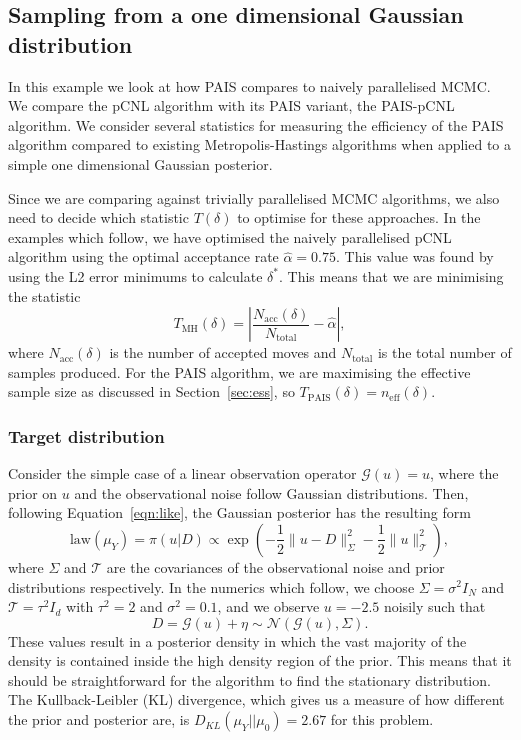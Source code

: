 \documentclass[final]{siamltex}
\newcommand{\G}{\mathcal{G}}
\newcommand{\neff}{n_{\text{eff}}}
\begin{document}
\subsection{Sampling from a one dimensional Gaussian distribution}\label{sec:problem 1}

In this example we look at how PAIS compares to naively parallelised
MCMC. We compare the pCNL algorithm \cite{cotter2013mcmc} with its
PAIS variant, the PAIS-pCNL algorithm. We consider several statistics
for measuring the efficiency of the PAIS algorithm compared to
existing Metropolis-Hastings algorithms when applied to a simple one
dimensional Gaussian posterior.


Since we are comparing against trivially parallelised MCMC algorithms,
we also need to decide which statistic $T(\delta)$ to optimise for
these approaches. In the examples which follow, we have optimised the naively parallelised pCNL algorithm using the optimal acceptance rate $\hat{\alpha} = 0.75$. This value was found by using the L2 error minimums to calculate $\delta^*$. This means that we are minimising the statistic
\[
	T_{\text{MH}}(\delta) = \left| \frac{N_{\text{acc}}(\delta)}{N_{\text{total}}} - \hat{\alpha} \right|,
\]
where $N_{\text{acc}}(\delta)$ is the number of accepted moves and
$N_{\text{total}}$ is the total number of samples produced. For the
PAIS algorithm, we are maximising the effective sample size as
discussed in Section~\ref{sec:ess}, so $T_{\text{PAIS}}(\delta) =
\neff(\delta)$.

\subsubsection{Target distribution}

Consider the simple case of a linear observation operator $\G(u) = u$, where the prior on $u$ and the observational noise follow Gaussian distributions. Then, following Equation~\ref{eqn:like}, the Gaussian posterior has the resulting form
\begin{equation}\label{eqn:Gaussian posterior}
	\text{law}(\mu_Y) = \pi(u|D) \propto \exp\left(-\frac{1}{2}\big\|u - D\big\|^2_\Sigma - \frac{1}{2}\big\|u\big\|^2_{\mathcal{T}}\right),
\end{equation}
where $\Sigma$ and $\mathcal{T}$ are the covariances of the
observational noise and prior distributions respectively. In the
numerics which follow, we choose $\Sigma = \sigma^2I_N$ and
$\mathcal{T} = \tau^2I_d$ with $\tau^2 =2$ and $\sigma^2 = 0.1$, and
we observe $u=-2.5$ noisily such that
\[
D = \mathcal{G}(u) + \eta \sim \mathcal{N}(\mathcal{G}(u),\Sigma).
\]
These values result in a posterior density in which the vast majority
of the density is contained inside the high density region of the
prior. This means that it should be straightforward for the algorithm
to find the stationary distribution. The Kullback-Leibler (KL)
divergence, which gives us a measure of how different the prior and
posterior are, is $D_{KL}(\mu_Y || \mu_0) = 2.67$ for this problem.
\end{document}
